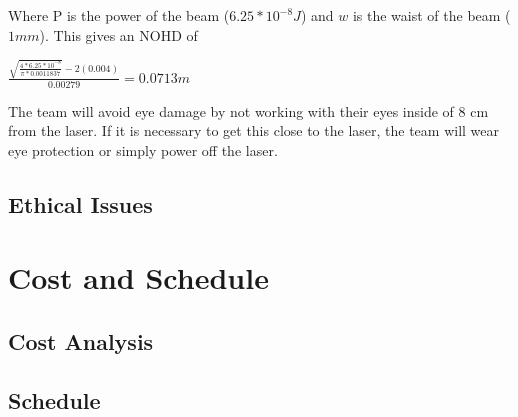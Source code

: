 \documentclass[letterpaper,10pt]{article}
\begin{document}
\begin{spacing}{1.15}
Where P is the power of the beam ($6.25*10^{-8} J$) and $w$ is the waist of the beam ($1mm$). This gives an NOHD of 

{\Large$ \frac{\sqrt{\frac{4 * 6.25*10^{-8}}{\pi * 0.0011837}} - 2(0.004)}{0.00279} = 0.0713 m $}

The team will avoid eye damage by not working with their eyes inside of 8 cm from the laser. If it is necessary to get this close to the laser, the team will wear eye protection or simply power off the laser. 


\subsection{Ethical Issues}


\clearpage
\section{Cost and Schedule}
\subsection{Cost Analysis}
\subsection{Schedule}




\clearpage


\clearpage
\end{spacing}
\end{document}
